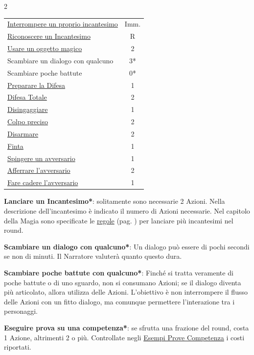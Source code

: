 \begin{multicols}{2}
\begin{tabularx}{1\linewidth}{Xc}
\rowcolor{gray!20}\hyperlink{magiedurata}{Interrompere un proprio incantesimo} & Imm.\\
\hyperlink{riconoscereincantesimo}{Riconoscere un Incantesimo}& R\\
\rowcolor{gray!20}\hyperlink{regoleoggettimagici}{Usare un oggetto magico}& 2\\
\midrule
Scambiare un dialogo con qualcuno& 3*\\
\rowcolor{gray!20}Scambiare poche battute& 0*\\
\midrule
\hyperlink{preparareladifesa}{Preparare la Difesa} & 1\\
\rowcolor{gray!20}\hyperlink{difesatotale}{Difesa Totale} & 2\\
\hyperlink{disingaggiare}{Disingaggiare} & 1\\
\rowcolor{gray!20}\hyperlink{colpopreciso}{Colpo preciso} & 2\\
\midrule
\hyperlink{disarmare}{Disarmare} & 2\\
\rowcolor{gray!20}\hyperlink{finta}{Finta} & 1\\
\hyperlink{spingereavversario}{Spingere un avversario} & 1\\
\rowcolor{gray!20}\hyperlink{afferrareunavversario}{Afferrare l'avversario} & 2\\
\hyperlink{farecadereavversario}{Fare cadere l'avversario} & 1
\end{tabularx}

\medskip

\textbf{Lanciare un Incantesimo*}: solitamente sono necessarie 2 Azioni. Nella descrizione dell'incantesimo è indicato il numero di Azioni necessarie. Nel capitolo della Magia sono specificate le \hyperlink{piumagieround}{regole} (pag. \pageref{piumagieround}) per lanciare più incantesimi nel round.

\textbf{Scambiare un dialogo con qualcuno*}: Un dialogo può essere di pochi secondi se non di minuti. Il Narratore valuterà quanto questo dura.

\textbf{Scambiare poche battute con qualcuno*}: Finché si tratta veramente di poche battute o di uno sguardo, non si consumano Azioni; se il dialogo diventa più articolato, allora utilizza delle Azioni. L'obiettivo è non interrompere il flusso delle Azioni con un fitto dialogo, ma comunque permettere l'interazione tra i personaggi.

\textbf{Eseguire prova su una competenza*}: se sfrutta una frazione del round, costa 1 Azione, altrimenti 2 o più. Controllate negli \hyperlink{esempiprovecompetenze}{Esempi Prove Competenza} i costi riportati.


\end{multicols}

